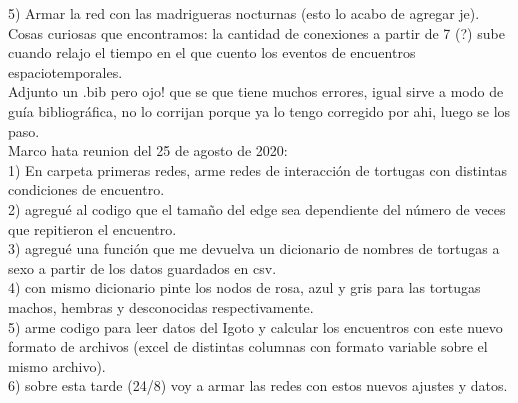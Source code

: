 \documentclass[12pt,screen,twoside,pagebackref]{ibtesis}
\begin{document}
5) Armar la red con las madrigueras nocturnas (esto lo acabo de agregar je).\\

Cosas curiosas que encontramos: la cantidad de conexiones a partir de 7 (?) sube cuando relajo el tiempo en el que cuento los eventos de encuentros espaciotemporales.\\
Adjunto un .bib pero ojo! que se que tiene muchos errores, igual sirve a modo de guía bibliográfica, no lo corrijan porque ya lo tengo corregido por ahi, luego se los paso.\\

Marco hata reunion del 25 de agosto de 2020: \\
1) En carpeta primeras redes, arme redes de interacción de tortugas con distintas condiciones de encuentro.\\
2) agregué al codigo que el tamaño del edge sea dependiente del número de veces que  repitieron el encuentro.\\
3) agregué una función que me devuelva un dicionario de nombres de tortugas a sexo a partir de los datos guardados en csv.\\ 
4) con mismo dicionario pinte los nodos de rosa, azul y gris  para las tortugas machos, hembras y desconocidas respectivamente.\\ 
5) arme codigo para leer datos del Igoto y calcular los encuentros con este nuevo formato de archivos (excel de distintas columnas con formato variable sobre el mismo archivo).\\
6) sobre esta tarde (24/8) voy a armar las redes con estos nuevos ajustes y datos. 



  


    
\end{document}
